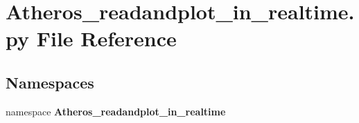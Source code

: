 \section{Atheros\_\-readandplot\_\-in\_\-realtime.py File Reference}
\label{Atheros__readandplot__in__realtime_8py}
\subsection*{Namespaces}
\begin{CompactItemize}
\item 
namespace {\bf Atheros\_\-readandplot\_\-in\_\-realtime}
\end{CompactItemize}
